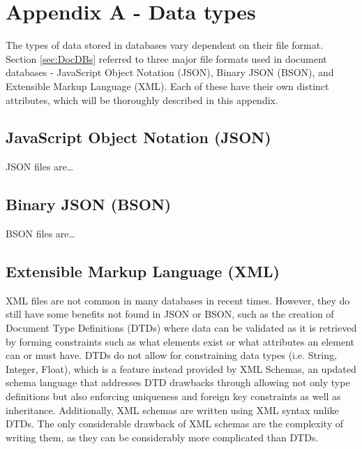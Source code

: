 \begingroup
\renewcommand\thechapter{A}
\titleformat{\chapter}[display]
{\normalfont\huge\bfseries}{}{20pt}{\Huge}
\setcounter{section}{0}
\setcounter{figure}{0} 

\chapter*{Appendix A - Data types}

The types of data stored in databases vary dependent on their file format. Section \ref{sec:DocDBs} referred to three 
major file formats used in document databases - JavaScript Object Notation (JSON), Binary JSON (BSON), and Extensible Markup Language (XML).
Each of these have their own distinct attributes, which will be thoroughly described in this appendix.

\section{JavaScript Object Notation (JSON)}
JSON files are\dots


\section{Binary JSON (BSON)}
BSON files are\dots


\section{Extensible Markup Language (XML)}

XML files are not common in many databases in recent times. However, they do still have some benefits not found in JSON or
BSON, such as the creation of Document Type Definitions (DTDs) where data can be 
validated as it is retrieved by forming constraints such as what elements exist or what attributes an element can
or must have. DTDs do not allow for constraining data types (i.e. String, Integer, Float), which is a feature instead
provided by XML Schemas, an updated schema language that addresses DTD drawbacks through allowing not only type definitions
but also enforcing uniqueness and foreign key constraints as well as inheritance. Additionally, XML schemas are written
using XML syntax unlike DTDs. The only considerable drawback of XML schemas are the complexity of writing them, as they can
be considerably more complicated than DTDs.


\endgroup